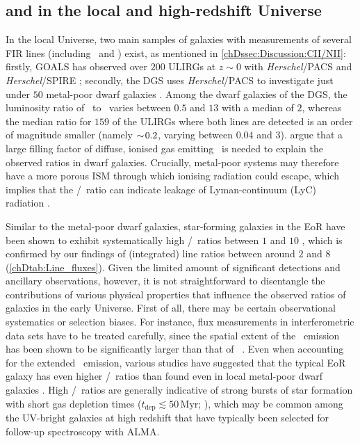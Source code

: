 \subsection{\texorpdfstring{\OIIILam}{[O III] 88 μm} and \texorpdfstring{\CIILam}{[C II] 158 μm} in the local and high-redshift Universe}
\label{chDssec:Discussion:OIII/CII_in_the_local_and_high-redshift_Universe}

In the local Universe, two main samples of galaxies with measurements of several FIR lines (including \OIIIf\ and \CII) exist, as mentioned in \cref{chDssec:Discussion:CII/NII}: firstly, GOALS has observed over $200$ ULIRGs at $z \sim 0$ with \textit{Herschel}/PACS and \textit{Herschel}/SPIRE \citep{2017ApJ...846...32D}; secondly, the DGS uses \textit{Herschel}/PACS to investigate just under $50$ metal-poor dwarf galaxies \citep{2013PASP..125..600M, 2014PASP..126.1079M, 2014A&A...568A..62D, 2015A&A...578A..53C, 2019A&A...626A..23C}. Among the dwarf galaxies of the DGS, the luminosity ratio of \OIIILam\ to \CIILam\ varies between $0.5$ and $13$ with a median of $2$, whereas the median ratio for $159$ of the ULIRGs where both lines are detected is an order of magnitude smaller (namely $\sim \! 0.2$, varying between $0.04$ and $3$). \citet{2015A&A...578A..53C} argue that a large filling factor of diffuse, ionised gas emitting \OIIILam\ is needed to explain the observed ratios in dwarf galaxies. Crucially, metal-poor systems may therefore have a more porous ISM through which ionising radiation could escape, which implies that the \OIIIf/\CII\ ratio can indicate leakage of Lyman-continuum (LyC) radiation \citep[see also][]{2016Sci...352.1559I, 2020MNRAS.498..164K}.

Similar to the metal-poor dwarf galaxies, star-forming galaxies in the EoR have been shown to exhibit systematically high \OIIIf/\CII\ ratios between $1$ and $10$ \citep{2020ApJ...896...93H}, which is confirmed by our findings of (integrated) line ratios between around $2$ and $8$ (\cref{chDtab:Line_fluxes}). Given the limited amount of significant detections and ancillary observations, however, it is not straightforward to disentangle the contributions of various physical properties that influence the observed ratios of galaxies in the early Universe. First of all, there may be certain observational systematics or selection biases. For instance, flux measurements in interferometric data sets have to be treated carefully, since the spatial extent of the \CII\ emission has been shown to be significantly larger than that of \OIIIf\ \citep[][; see also \cref{chDsssec:Observations:ALMA_data_reduction}]{2018MNRAS.478.1170C, 2020MNRAS.499.5136C}. Even when accounting for the extended \CII\ emission, various studies have suggested that the typical EoR galaxy has even higher \OIIIf/\CII\ ratios than found even in local metal-poor dwarf galaxies \citep{2020MNRAS.499.5136C, 2020ApJ...896...93H}. High \OIIIf/\CII\ ratios are generally indicative of strong bursts of star formation with short gas depletion times ($t_\text{dep} \lesssim 50 \, \mathrm{Myr}$; \citealt{2021MNRAS.505.5543V}), which may be common among the UV-bright galaxies at high redshift that have typically been selected for follow-up spectroscopy with ALMA.

